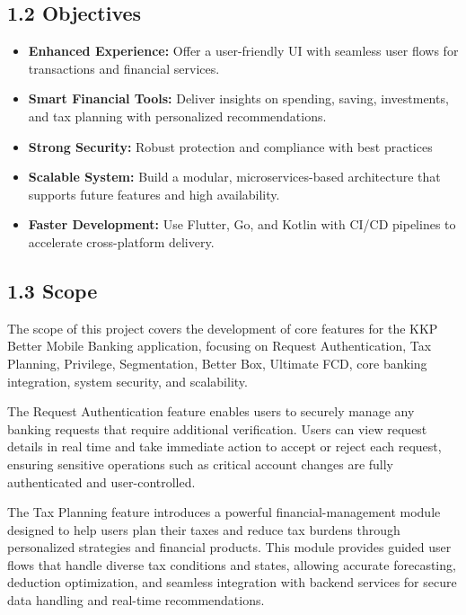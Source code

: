\subsection{\texorpdfstring{\textbf{1.2
Objectives}}{1.2 Objectives}}\label{objectives}

\begin{itemize}
\item
  \textbf{Enhanced Experience:} Offer a user-friendly UI with seamless
  user flows for transactions and financial services.
\item
  \textbf{Smart Financial Tools:} Deliver insights on spending, saving,
  investments, and tax planning with personalized recommendations.
\item
  \textbf{Strong Security:} Robust protection and compliance with best
  practices
\item
  \textbf{Scalable System:} Build a modular, microservices-based
  architecture that supports future features and high availability.
\item
  \textbf{Faster Development:} Use Flutter, Go, and Kotlin with CI/CD
  pipelines to accelerate cross-platform delivery.
\end{itemize}

\subsection{\texorpdfstring{\textbf{1.3 Scope}}{1.3 Scope}}\label{scope}

The scope of this project covers the development of core features for
the KKP Better Mobile Banking application, focusing on Request
Authentication, Tax Planning, Privilege, Segmentation, Better Box,
Ultimate FCD, core banking integration, system security, and
scalability.

The Request Authentication feature enables users to securely manage any
banking requests that require additional verification. Users can view
request details in real time and take immediate action to accept or
reject each request, ensuring sensitive operations such as critical
account changes are fully authenticated and user-controlled.

The Tax Planning feature introduces a powerful financial-management
module designed to help users plan their taxes and reduce tax burdens
through personalized strategies and financial products. This module
provides guided user flows that handle diverse tax conditions and
states, allowing accurate forecasting, deduction optimization, and
seamless integration with backend services for secure data handling and
real-time recommendations.

